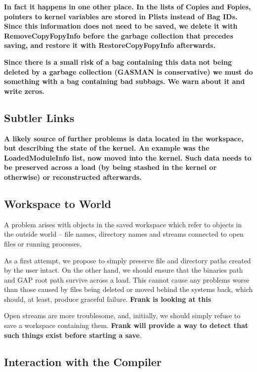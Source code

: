 \documentclass[11pt]{article}
\begin{document}
\textbf{In fact it happens in one other place. In the lists of Copies
and Fopies, pointers to kernel variables are stored in Plists instead
of Bag IDs. Since this information does not need to be saved, we
delete it with RemoveCopyFopyInfo before the garbage collection that
precedes saving, and restore it with RestoreCopyFopyInfo afterwards.}

\textbf{Since there is a small risk of a bag containing this data not
being deleted by a garbage collection (GASMAN is conservative) we must
do something with a bag containing bad subbags. We warn about it and write
zeros.}

\subsection{Subtler Links}

\textbf{A likely source of further problems is data located in the
workspace, but describing the state of the kernel. An example was the
LoadedModuleInfo list, now moved into the kernel.  Such data needs to
be preserved across a load (by being stashed in the kernel or
otherwise) or reconstructed afterwards.}

\subsection{Workspace to World}

A problem arises with objects in the saved workspace which refer to
objects in the outside world -- file names, directory names and streams
connected to open files or running processes.

As a first attempt, we propose to simply preserve file and directory
paths created by the user intact. On the other hand, we should ensure
that the binaries path and GAP root path survive across a load. This
cannot cause any problems worse than those caused by files being
deleted or moved behind the systems back, which should, at least,
produce graceful failure. \textbf{Frank is looking at this}

Open streams are more troublesome, and, initially, we should simply
refuse to save a workspace containing them. \textbf{Frank will provide
a way to detect that such things exist before starting a save}.


\subsection{Interaction with the Compiler}
\end{document}
